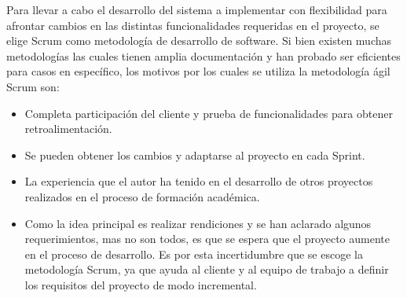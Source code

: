 Para llevar a cabo el desarrollo del sistema a implementar con flexibilidad para afrontar cambios en las distintas funcionalidades requeridas en el proyecto, se elige Scrum como metodología de desarrollo de software. Si bien existen muchas metodologías las cuales tienen amplia documentación y han probado ser eficientes para casos en específico, los motivos por los cuales se utiliza la metodología ágil Scrum son:

\begin{itemize}
    \item Completa participación del cliente y prueba de funcionalidades para obtener retroalimentación.

    \item Se pueden obtener los cambios y adaptarse al proyecto en cada Sprint.
    
    \item La experiencia que el autor ha tenido en el desarrollo de otros proyectos realizados en el proceso de formación académica.
    
    \item Como la idea principal es realizar rendiciones y se han aclarado algunos requerimientos, mas no son todos, es que se espera que el proyecto aumente en el proceso de desarrollo. Es por esta incertidumbre que se escoge la metodología Scrum, ya que ayuda al cliente y al equipo de trabajo a definir los requisitos del proyecto de modo incremental.
\end{itemize}